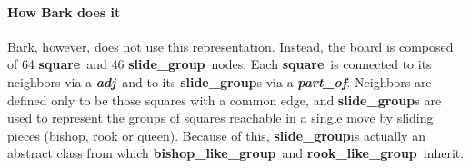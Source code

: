 \documentclass[twocolumn, a4paper]{scrartcl}
\newcommand{\noderepr}[1]{\textsf{\textbf{#1}}}
\newcommand{\edgerepr}[1]{\textit{\textbf{#1}}}
\newcommand{\squarenode}{\noderepr{square}}
\newcommand{\slidegroupnode}{\noderepr{slide\_group}}
\newcommand{\bishopgroupnode}{\noderepr{bishop\_like\_group}}
\newcommand{\rookgroupnode}{\noderepr{rook\_like\_group}}
\newcommand{\adj}{\edgerepr{adj}}
\newcommand{\partof}{\edgerepr{part\_of}}
\begin{document}
    \paragraph{How Bark does it} Bark, however, does not use this representation. Instead, the board is composed of 64 \squarenode\ and 46 \slidegroupnode\  nodes. Each \squarenode\ is connected to its neighbors via a \adj\ and to its \slidegroupnode s via a \partof. Neighbors are defined only to be those squares with a common edge, and \slidegroupnode s are used to represent the groups of squares reachable in a single move by sliding pieces (bishop, rook or queen). Because of this, \slidegroupnode is actually an abstract class from which \bishopgroupnode\ and \rookgroupnode\ inherit.
\end{document}
